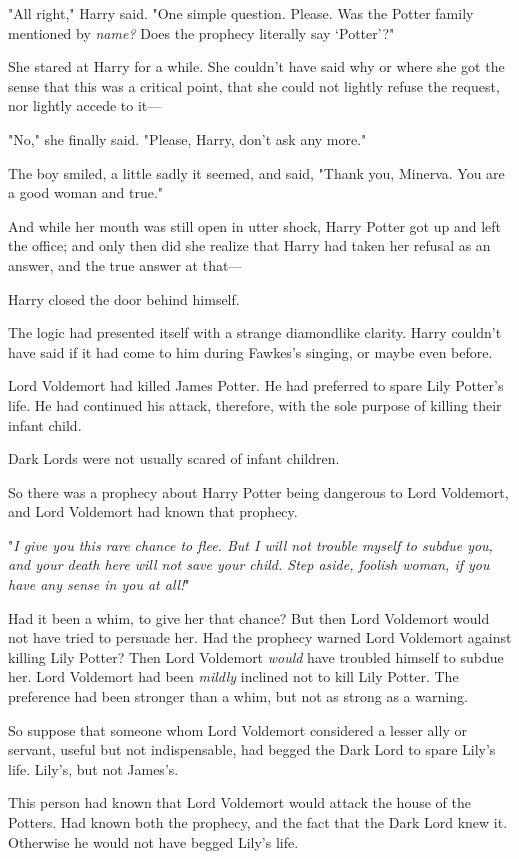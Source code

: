 "All right," Harry said. "One simple question. Please. Was the Potter family 
mentioned by \emph{name?} Does the prophecy literally say `Potter'?"

She stared at Harry for a while. She couldn't have said why or where she got 
the sense that this was a critical point, that she could not lightly refuse the 
request, nor lightly accede to it---

"No," she finally said. "Please, Harry, don't ask any more."

The boy smiled, a little sadly it seemed, and said, "Thank you, Minerva. You 
are a good woman and true."

And while her mouth was still open in utter shock, Harry Potter got up and left 
the office; and only then did she realize that Harry had taken her refusal as 
an answer, and the true answer at that---

Harry closed the door behind himself.

The logic had presented itself with a strange diamondlike clarity. Harry 
couldn't have said if it had come to him during Fawkes's singing, or maybe even 
before.

Lord Voldemort had killed James Potter. He had preferred to spare Lily Potter's 
life. He had continued his attack, therefore, with the sole purpose of killing 
their infant child.

Dark Lords were not usually scared of infant children.

So there was a prophecy about Harry Potter being dangerous to Lord Voldemort, 
and Lord Voldemort had known that prophecy.

"\emph{I give you this rare chance to flee. But I will not trouble myself to 
subdue you, and your death here will not save your child. Step aside, foolish 
woman, if you have any sense in you at all!}"

Had it been a whim, to give her that chance? But then Lord Voldemort would not 
have tried to persuade her. Had the prophecy warned Lord Voldemort against 
killing Lily Potter? Then Lord Voldemort \emph{would} have troubled himself to 
subdue her. Lord Voldemort had been \emph{mildly} inclined not to kill Lily 
Potter. The preference had been stronger than a whim, but not as strong as a 
warning.

So suppose that someone whom Lord Voldemort considered a lesser ally or 
servant, useful but not indispensable, had begged the Dark Lord to spare Lily's 
life. Lily's, but not James's.

This person had known that Lord Voldemort would attack the house of the 
Potters. Had known both the prophecy, and the fact that the Dark Lord knew it. 
Otherwise he would not have begged Lily's life.

